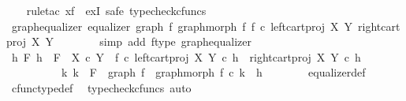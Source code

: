 \begin{isabellebody}
\ \ \isamarkupfalse%
\ {\isacharparenleft}{\kern0pt}rule{\isacharunderscore}{\kern0pt}tac\ x{\isacharequal}{\kern0pt}f\ \ exI{\isacharcomma}{\kern0pt}\ safe{\isacharcomma}{\kern0pt}\ typecheck{\isacharunderscore}{\kern0pt}cfuncs{\isacharparenright}{\kern0pt}\isanewline
\ \ \ \ \isamarkupfalse%
\ graph{\isacharunderscore}{\kern0pt}equalizer{\isacharcolon}{\kern0pt}\ {\isachardoublequoteopen}equalizer\ {\isacharparenleft}{\kern0pt}graph\ f{\isacharparenright}{\kern0pt}\ {\isacharparenleft}{\kern0pt}graph{\isacharunderscore}{\kern0pt}morph\ f{\isacharparenright}{\kern0pt}\ {\isacharparenleft}{\kern0pt}f\ {\isasymcirc}\isactrlsub c\ left{\isacharunderscore}{\kern0pt}cart{\isacharunderscore}{\kern0pt}proj\ X\ Y{\isacharparenright}{\kern0pt}\ {\isacharparenleft}{\kern0pt}right{\isacharunderscore}{\kern0pt}cart{\isacharunderscore}{\kern0pt}proj\ X\ Y{\isacharparenright}{\kern0pt}{\isachardoublequoteclose}\isanewline
\ \ \ \ \ \ \isamarkupfalse%
\ {\isacharparenleft}{\kern0pt}simp\ add{\isacharcolon}{\kern0pt}\ f{\isacharunderscore}{\kern0pt}type\ graph{\isacharunderscore}{\kern0pt}equalizer{}{\isacharparenright}{\kern0pt}\isanewline
\ \ \ \ \isamarkupfalse%
\ \isamarkupfalse%
\ {\isachardoublequoteopen}{\isasymforall}h\ F{\isachardot}{\kern0pt}\ h\ {\isacharcolon}{\kern0pt}\ F\ {\isasymrightarrow}\ X\ {\isasymtimes}\isactrlsub c\ Y\ {\isasymand}\ {\isacharparenleft}{\kern0pt}f\ {\isasymcirc}\isactrlsub c\ left{\isacharunderscore}{\kern0pt}cart{\isacharunderscore}{\kern0pt}proj\ X\ Y{\isacharparenright}{\kern0pt}\ {\isasymcirc}\isactrlsub c\ h\ {\isacharequal}{\kern0pt}\ right{\isacharunderscore}{\kern0pt}cart{\isacharunderscore}{\kern0pt}proj\ X\ Y\ {\isasymcirc}\isactrlsub c\ h\ {\isasymlongrightarrow}\isanewline
\ \ \ \ \ \ \ \ \ \ {\isacharparenleft}{\kern0pt}{\isasymexists}{\isacharbang}{\kern0pt}k{\isachardot}{\kern0pt}\ k\ {\isacharcolon}{\kern0pt}\ F\ {\isasymrightarrow}\ graph\ f\ {\isasymand}\ graph{\isacharunderscore}{\kern0pt}morph\ f\ {\isasymcirc}\isactrlsub c\ k\ {\isacharequal}{\kern0pt}\ h{\isacharparenright}{\kern0pt}{\isachardoublequoteclose}\isanewline
\ \ \ \ \ \ \isamarkupfalse%
\ equalizer{\isacharunderscore}{\kern0pt}def\ \isamarkupfalse%
\ cfunc{\isacharunderscore}{\kern0pt}type{\isacharunderscore}{\kern0pt}def\ \isamarkupfalse%
\ {\isacharparenleft}{\kern0pt}typecheck{\isacharunderscore}{\kern0pt}cfuncs{\isacharcomma}{\kern0pt}\ auto{\isacharparenright}{\kern0pt}\isanewline

\end{isabellebody}
